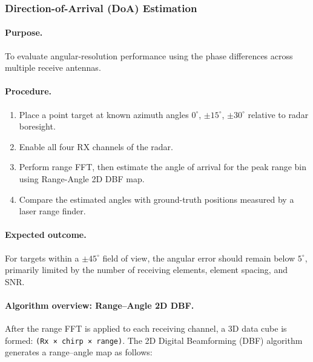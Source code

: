\subsubsection{Direction-of-Arrival (DoA) Estimation}\label{sec:doa_test}

\paragraph{Purpose.}
To evaluate angular-resolution performance using the phase differences across multiple receive antennas.

\paragraph{Procedure.}
\begin{enumerate}
    \item Place a point target at known azimuth angles $0^{\circ}$, $\pm15^{\circ}$, $\pm30^{\circ}$ relative to radar boresight.
    \item Enable all four RX channels of the radar.
    \item Perform range FFT, then estimate the angle of arrival for the peak range bin using Range-Angle 2D DBF
map.
    \item Compare the estimated angles with ground-truth positions measured by a laser range finder.
\end{enumerate}


\paragraph{Expected outcome.}
For targets within a $\pm45^{\circ}$ field of view, the angular error should remain below $5^{\circ}$, primarily limited by the number of receiving elements, element spacing, and SNR.

\paragraph{Algorithm overview: Range–Angle 2D DBF.}  
After the range FFT is applied to each receiving channel, a 3D data cube is formed: \texttt{(Rx\,×\,chirp\,×\,range)}.  
The 2D Digital Beamforming (DBF) algorithm generates a range–angle map as follows:


